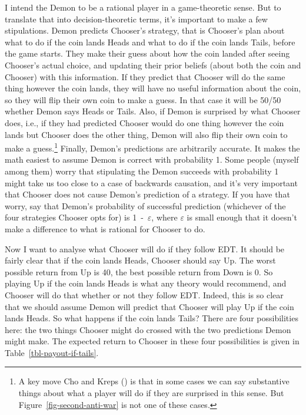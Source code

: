 \documentclass[
  10pt,
  letterpaper,
  DIV=11,
  numbers=noendperiod,
  twoside]{scrartcl}
\begin{document}
I intend the Demon to be a rational player in a game-theoretic sense.
But to translate that into decision-theoretic terms, it's important to
make a few stipulations. Demon predicts Chooser's strategy, that is
Chooser's plan about what to do if the coin lands Heads and what to do
if the coin lands Tails, before the game starts. They make their guess
about how the coin landed after seeing Chooser's actual choice, and
updating their prior beliefs (about both the coin and Chooser) with this
information. If they predict that Chooser will do the same thing however
the coin lands, they will have no useful information about the coin, so
they will flip their own coin to make a guess. In that case it will be
50/50 whether Demon says Heads or Tails. Also, if Demon is surprised by
what Chooser does, i.e., if they had predicted Chooser would do one
thing however the coin lands but Chooser does the other thing, Demon
will also flip their own coin to make a guess.\footnote{A key move Cho
  and Kreps () is that in some cases we
  can say substantive things about what a player will do if they are
  surprised in this sense. But Figure~\ref{fig-second-anti-war} is not
  one of these cases.} Finally, Demon's predictions are arbitrarily
accurate. It makes the math easiest to assume Demon is correct with
probability 1. Some people (myself among them) worry that stipulating
the Demon succeeds with probability 1 might take us too close to a case
of backwards causation, and it's very important that Chooser does not
cause Demon's prediction of a strategy. If you have that worry, say that
Demon's probability of successful prediction (whichever of the four
strategies Chooser opts for) is 1~-~\(\varepsilon\), where
\(\varepsilon\) is small enough that it doesn't make a difference to
what is rational for Chooser to do.

Now I want to analyse what Chooser will do if they follow EDT. It should
be fairly clear that if the coin lands Heads, Chooser should say Up. The
worst possible return from Up is 40, the best possible return from Down
is 0. So playing Up if the coin lands Heads is what any theory would
recommend, and Chooser will do that whether or not they follow EDT.
Indeed, this is so clear that we should assume Demon will predict that
Chooser will play Up if the coin lands Heads. So what happens if the
coin lands Tails? There are four possibilities here: the two things
Chooser might do crossed with the two predictions Demon might make. The
expected return to Chooser in these four possibilities is given in
Table~\ref{tbl-payout-if-tails}.
\end{document}
